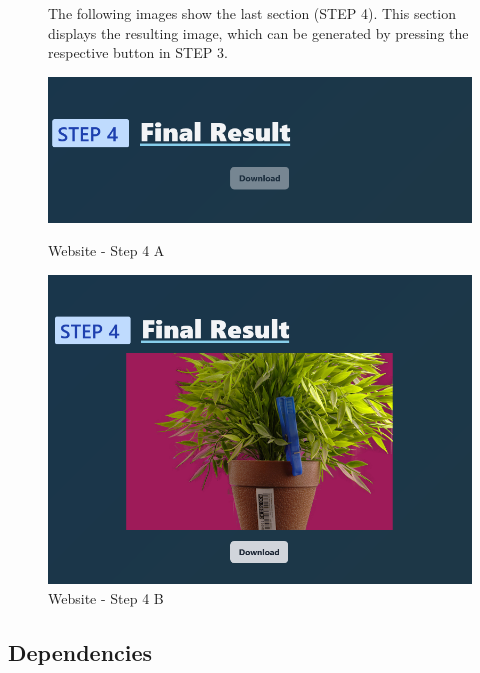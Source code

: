 \documentclass[a4paper]{article}
\begin{document}
\begin{figure}[h]
    \centering
    \begin{minipage}[b]{0.49\textwidth}
        \centering
        \begin{minipage}[t]{\textwidth}
            The following images show the last section (\textsc{STEP 4}).
            This section displays the resulting image, which can be
            generated by pressing the respective button in \textsc{STEP 3}.
            \vspace{1cm}
        \end{minipage}
        \includegraphics[width=\textwidth]{website/step4A.png}
        \caption{Website - Step 4 A}
        \label{fig:fig3a}
    \end{minipage}
    \hfill
    \begin{minipage}[b]{0.49\textwidth}
        \includegraphics[width=\textwidth]{website/step4B.png}
        \caption{Website - Step 4 B}
        \label{fig:fig3b}
    \end{minipage}
\end{figure}

\pagebreak

\subsection{Dependencies}
\end{document}

